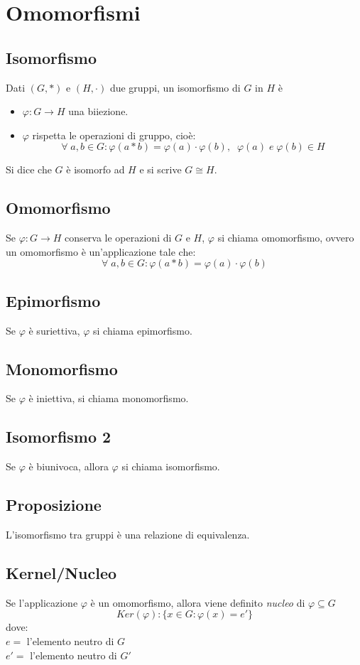 \section{Omomorfismi}

\subsection{Isomorfismo}
Dati \((G,*)\) e \((H,\cdot)\) due gruppi, un isomorfismo di \(G\) in \(H\) è
\begin{itemize}
	\item \(\varphi :G\rightarrow H\) una biiezione.
	\item \(\varphi\) rispetta le operazioni di gruppo, cioè:
	\[\forall\; a,b \in G: \varphi (a*b)=\varphi(a)\cdot\varphi (b),\;\; \varphi(a)\;e\;\varphi (b)\in H\]
\end{itemize}
Si dice che \(G\) è isomorfo ad \(H\) e si scrive \(G\cong H\).

\subsection{Omomorfismo}
Se \(\varphi :G\rightarrow H\) conserva le operazioni di \(G\) e \(H\), \(\varphi\) si chiama omomorfismo, ovvero un omomorfismo è un'applicazione tale che:
\[\forall\;a,b\in G:\varphi(a*b)=\varphi (a)\cdot\varphi (b)\]

\subsection{Epimorfismo}
Se \(\varphi\) è suriettiva, \(\varphi\) si chiama epimorfismo.

\subsection{Monomorfismo}
Se \(\varphi\) è iniettiva, si chiama monomorfismo.

\subsection{Isomorfismo 2}
Se \(\varphi\) è biunivoca, allora \(\varphi\) si chiama isomorfismo.

\subsection{Proposizione}
L'isomorfismo tra gruppi è una relazione di equivalenza.

\subsection{Kernel/Nucleo}
Se l'applicazione \(\varphi\) è un omomorfismo, allora viene definito \textit{nucleo} di \(\varphi\subseteq G\)
\[Ker(\varphi):\{x\in G:\varphi(x)=e'\}\]
dove:
\\\(e=\) l'elemento neutro di \(G\)
\\\(e'=\) l'elemento neutro di \(G'\)

